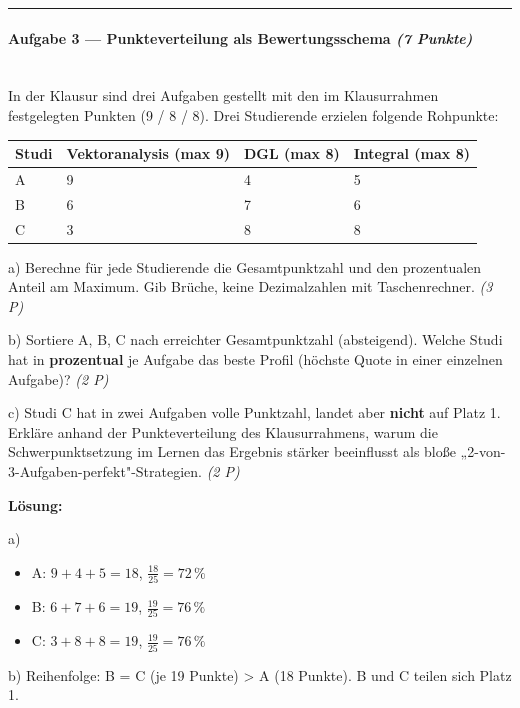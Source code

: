 \documentclass[11pt, a4paper]{article}
\begin{document}
\noindent\textcolor{rulegray}{\rule{\linewidth}{0.4pt}}


\paragraph{Aufgabe 3 — Punkteverteilung als Bewertungsschema \textit{(7 Punkte)}}\mbox{}\\[2pt]

In der Klausur sind drei Aufgaben gestellt mit den im Klausurrahmen festgelegten Punkten (9 / 8 / 8). Drei Studierende erzielen folgende Rohpunkte:



{\small
\begin{tabularx}{\linewidth}{XXXX}
\hline
\rowcolor{tableheadbg}
{\color{white}\textbf{Studi}} & {\color{white}\textbf{Vektoranalysis (max 9)}} & {\color{white}\textbf{DGL (max 8)}} & {\color{white}\textbf{Integral (max 8)}} \\[2pt]
\hline
\endhead
\hline
\endfoot
A & 9 & 4 & 5 \\
B & 6 & 7 & 6 \\
C & 3 & 8 & 8 \\
\end{tabularx}
}


a) Berechne für jede Studierende die Gesamtpunktzahl und den prozentualen Anteil am Maximum. Gib Brüche, keine Dezimalzahlen mit Taschenrechner. \textit{(3 P)}


b) Sortiere A, B, C nach erreichter Gesamtpunktzahl (absteigend). Welche Studi hat in \textbf{prozentual} je Aufgabe das beste Profil (höchste Quote in einer einzelnen Aufgabe)? \textit{(2 P)}


c) Studi C hat in zwei Aufgaben volle Punktzahl, landet aber \textbf{nicht} auf Platz 1. Erkläre anhand der Punkteverteilung des Klausurrahmens, warum die Schwerpunktsetzung im Lernen das Ergebnis stärker beeinflusst als bloße „2-von-3-Aufgaben-perfekt"-Strategien. \textit{(2 P)}


\textbf{Lösung:}


a)

\begin{itemize}
  \item A: $9+4+5 = 18$, $\frac{18}{25} = 72\,\%$
  \item B: $6+7+6 = 19$, $\frac{19}{25} = 76\,\%$
  \item C: $3+8+8 = 19$, $\frac{19}{25} = 76\,\%$
\end{itemize}

b) Reihenfolge: B = C (je 19 Punkte) > A (18 Punkte). B und C teilen sich Platz 1.
\end{document}
